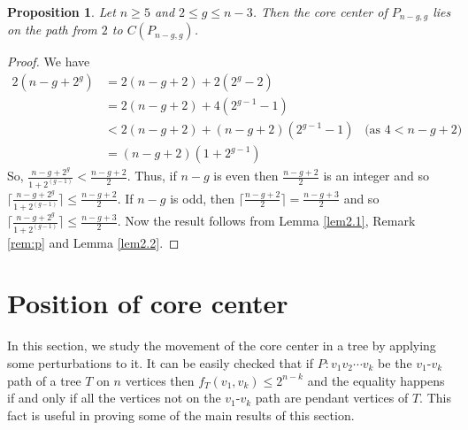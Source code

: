 \documentclass[10pt,a4paper]{amsart}
\newtheorem{proposition}[theorem]{Proposition}
\begin{document}
\begin{proposition}\label{prop3}
Let $n\geq 5$ and $2\leq g \leq n-3$. Then the core center of $P_{n-g,g}$ lies on the path from  $2$ to  $C(P_{n-g,g})$.
\end{proposition}
\begin{proof}
We have 
\begin{align*}
2(n-g+2^g)&= 2(n-g+2)+2(2^g-2)\\
          &=2(n-g+2)+4(2^{g-1}-1)\\
          &<2(n-g+2)+(n-g+2)(2^{g-1}-1)\;\;\;\mbox{(as $4<n-g+2$)}\\
          &=(n-g+2)(1+2^{g-1})
\end{align*}
So, $\frac{n-g+2^g}{1+2^{(g-1)}}<\frac{n-g+2}{2}.$ Thus, if $n-g$ is even then $\frac{n-g+2}{2}$ is an integer and so $\lceil \frac{n-g+2^g}{1+2^{(g-1)}} \rceil\leq \frac{n-g+2}{2}$. If $n-g$ is odd, then  $\lceil \frac{n-g+2}{2} \rceil=\frac{n-g+3}{2}$ and so $\lceil \frac{n-g+2^g}{1+2^{(g-1)}} \rceil\leq \frac{n-g+3}{2}$. Now the result follows from Lemma \ref{lem2.1}, Remark \ref{rem:p} and Lemma \ref{lem2.2}.
\end{proof}


\section{Position of core center}\label{pcc}

In this section, we study the movement of the core center in  a tree by applying some perturbations to it. It can be easily checked that if $P:v_1v_2\cdots v_k$ be the $v_1$-$v_k$ path of a tree $T$ on $n$ vertices then $f_T(v_1,v_k)\leq 2^{n-k}$ and the equality happens if and only if all the vertices not on the $v_1$-$v_k$ path are pendant vertices of $T$. This fact is useful in proving some of the main results of this section.
\end{document}
